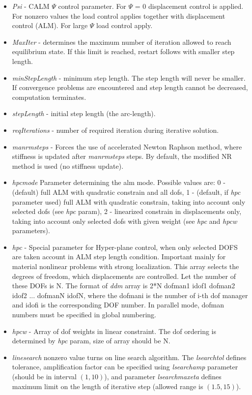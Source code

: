 \documentclass[draft]{article}
\newcommand{\param}[1]{{\em #1}}
\newcommand{\Pmode}[1]{{\sffamily #1}}
\begin{document}
\begin{itemize}
\item \param{Psi} - CALM $\Psi$ control parameter. For $\Psi$ = 0
displacement control is applied. For nonzero values the load control
applies together with displacement control (ALM). For large $\Psi$
load control apply.
\item \param{MaxIter} - determines the maximum number of iteration allowed to
reach equilibrium state. If this limit is reached, restart follows
with smaller step length.
\item \param{min\-Step\-Le\-ngth} - minimum step length. The step length will never be
smaller. If convergence problems are encountered and step length cannot
be decreased, computation terminates.
\item \param{stepLength} - initial step length (the arc-length).
\item \param{reqIterations} - number of required iteration during iterative solution. 
\item \param{manrmsteps} - Forces the use of accelerated
Newton Raphson met\-hod, where stiffness is updated after
\param{manrmsteps} steps. By default, the modified NR
method is used (no stiffness update).
\item \param{hpcmode} Parameter determining the alm mode.
Possible values are: 0 - (default) full ALM with quadratic constrain and
all dofs, 1 - (default, if \param{hpc} parameter used) full ALM with quadratic constrain, taking into account
only selected dofs (see \param{hpc} param), 2 - linearized constrain
in displacements only, taking into account only selected dofs with
given weight (see \param{hpc} and \param{hpcw} parameters).
\item \param{hpc} - Special parameter for Hyper-plane control, when only
selected DOFS are taken account in ALM step length
condition. Important mainly for material nonlinear problems with
strong localization. This array selects the degrees of freedom, 
which displacements are controlled. Let the number of these DOFs is N.
The format of \param{ddm} array is 2*N dofman1 idof1
dofman2 idof2 ... dofmanN idofN, where the dofmani is the number of i-th dof manager  and idofi is the
corresponding DOF number. \Pmode{In parallel mode, dofman numbers must
  be specified in global numbering.}
\item \param{hpcw} - Array of dof weights in linear constraint. The
dof ordering is determined by \param{hpc} param, size of array should
be N.
\item \param {linesearch} nonzero value turns on line search
  algorithm. The \param{lsearchtol} defines tolerance, amplification
  factor can be specified using \param{lsearchamp} parameter (should
  be in interval $(1,10)$), and parameter \param{lsearchmaxeta}
  defines maximum limit on the length of iterative step (allowed range
  is $(1.5,15)$).
\end{itemize}
\end{document}
